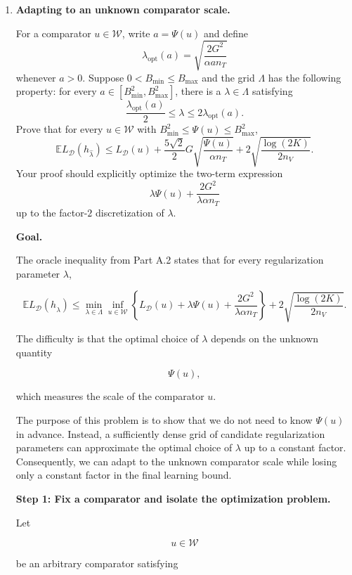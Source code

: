 \documentclass[11pt]{article}
\newcommand{\E}{\mathbb{E}}
\begin{document}
\begin{enumerate}
\begin{solutionbox}
\end{solutionbox}


\item \textbf{Adapting to an unknown comparator scale.}

For a comparator $u\in\mathcal W$, write $a=\Psi(u)$ and define
\[
\lambda_{\mathrm{opt}}(a)=\sqrt{\frac{2G^2}{\alpha a n_T}}
\]
whenever $a>0$. Suppose $0<B_{\min}\le B_{\max}$ and the grid $\Lambda$ has the following property: for every $a\in[B_{\min}^2,B_{\max}^2]$, there is a $\lambda\in\Lambda$ satisfying
\[
\frac{\lambda_{\mathrm{opt}}(a)}{2}\le\lambda\le2\lambda_{\mathrm{opt}}(a).
\]
Prove that for every $u\in\mathcal W$ with $B_{\min}^2\le\Psi(u)\le B_{\max}^2$,
\[
\E L_{\mathcal D}(h_{\widehat\lambda})
\le
L_{\mathcal D}(u)
+
\frac{5\sqrt2}{2}G\sqrt{\frac{\Psi(u)}{\alpha n_T}}
+
2\sqrt{\frac{\log(2K)}{2n_V}}.
\]
Your proof should explicitly optimize the two-term expression
\[
\lambda\Psi(u)+\frac{2G^2}{\lambda\alpha n_T}
\]
up to the factor-$2$ discretization of $\lambda$.

\begin{solutionbox}

\textbf{Goal.}

The oracle inequality from Part A.2 states that for every regularization parameter $\lambda$,

\[
\mathbb E L_{\mathcal D}(h_{\widehat{\lambda}})
\le
\min_{\lambda\in\Lambda}
\inf_{u\in\mathcal W}
\left\{
L_{\mathcal D}(u)
+
\lambda\Psi(u)
+
\frac{2G^2}{\lambda\alpha n_T}
\right\}
+
2\sqrt{\frac{\log(2K)}{2n_V}}.
\]

The difficulty is that the optimal choice of $\lambda$ depends on the unknown quantity

\[
\Psi(u),
\]

which measures the scale of the comparator $u$.

The purpose of this problem is to show that we do not need to know $\Psi(u)$ in advance. Instead, a sufficiently dense grid of candidate regularization parameters can approximate the optimal choice of $\lambda$ up to a constant factor. Consequently, we can adapt to the unknown comparator scale while losing only a constant factor in the final learning bound.

\medskip

\textbf{Step 1: Fix a comparator and isolate the optimization problem.}

Let

\[
u\in\mathcal W
\]

be an arbitrary comparator satisfying


\end{solutionbox}
\end{enumerate}
\end{document}

